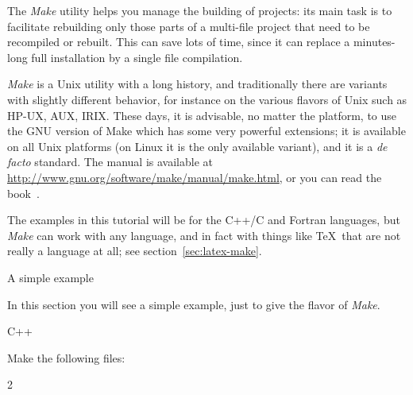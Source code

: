 
\lstset{language=shell}

The \emph{Make} utility helps you manage the building of
projects: its main task is to facilitate rebuilding only those parts 
of a multi-file project that need to be recompiled or rebuilt.
This can save lots of time, since it
can replace a minutes-long full installation by a single file
compilation.

\emph{Make} is a Unix utility with a long history, and traditionally
there are variants with slightly different behavior, 
for instance on the various
flavors of Unix such as HP-UX, AUX, IRIX. 
These days, it is advisable, no matter the platform,
to use the GNU version of Make which has some
very powerful extensions; it is available on all Unix platforms
(on Linux it is the only available variant),
and it is a {\it de facto} standard.
The manual is available at
\url{http://www.gnu.org/software/make/manual/make.html}, or you can
read the book~\cite{OReilly-GnuMake}.

The examples in this
tutorial will be for the C++/C and Fortran languages, but \emph{Make} can
work with any language, and in fact with things like \TeX\ that are
  not really a language at all; see section~\ref{sec:latex-make}.

 {A simple example}

\begin{purpose}
In this section you will see a simple example, just to give the flavor of
\emph{Make}.
\end{purpose}

   {C++}

Make the following files:

\begin{multicols}{2}
\columnbreak
{}
\end{multicols}

